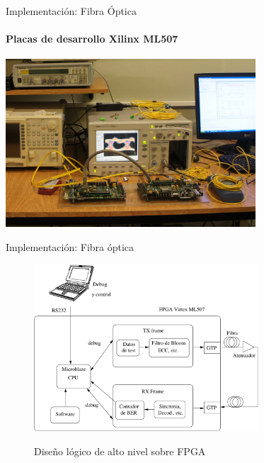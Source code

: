 \documentclass[aspectratio=169]{beamer}
\begin{document}
\begin{frame}{Implementación: Fibra Óptica}

\framesubtitle{Placas de desarrollo Xilinx ML507}
  \centering
  \includegraphics[width=0.7\textwidth]{graphs/fpga.jpg} 

\end{frame}

\begin{frame}{Implementación: Fibra óptica}

\begin{figure}[t]
  \centering
    \includegraphics[width=3.3in]{../graphs/fpgadesign.pdf}
     
     Diseño lógico de alto nivel sobre FPGA
\label{fig:fpgadesign}
\end{figure}

\end{frame}
\end{document}
